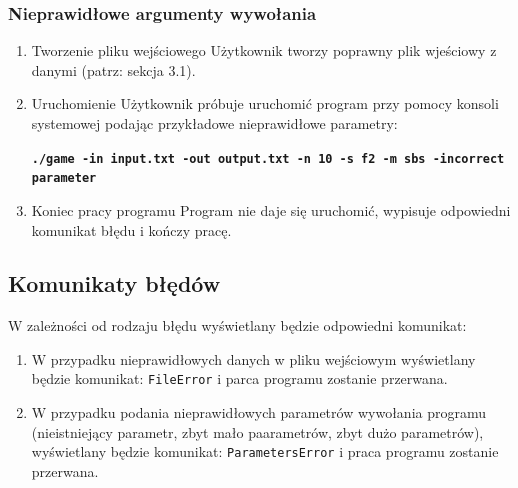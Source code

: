 \documentclass[a4paper]{article}
\begin{document}
\subsubsection{Nieprawid\l{}owe argumenty wywo\l{}ania}
\begin{enumerate}
	\item Tworzenie pliku wej\'sciowego
                U\.zytkownik tworzy poprawny plik wje\'sciowy z danymi (patrz: sekcja 3.1).
	\item Uruchomienie
		U\.zytkownik pr\'obuje uruchomi\'c program przy pomocy konsoli systemowej podaj\k{a}c przyk\l{}adowe nieprawid\l{}owe parametry:
	\begin{center}
                \texttt{\textbf{./game -in input.txt -out output.txt -n 10 -s f2 -m sbs -incorrect parameter}}
        \end{center}
	\item Koniec pracy programu
                Program nie daje si\k{e} uruchomi\'c, wypisuje odpowiedni komunikat b\l{}\k{e}du i ko\'nczy prac\k{e}.
\end{enumerate}

\subsection{Komunikaty b\l{}\k{e}d\'ow}
\quad W zale\.zno\'sci od rodzaju b\l{}\k{e}du wy\'swietlany b\k{e}dzie odpowiedni komunikat:
\begin{enumerate}
	\item W przypadku nieprawid\l{}owych danych w pliku wej\'sciowym wy\'swietlany b\k{e}dzie komunikat: \texttt{FileError} i parca programu zostanie przerwana.
	\item W przypadku podania nieprawid\l{}owych parametr\'ow wywo\l{}ania programu (nieistniej\k{a}cy parametr, zbyt ma\l{}o paarametr\'ow, zbyt du\.zo parametr\'ow), wy\'swietlany b\k{e}dzie komunikat: \texttt{ParametersError} i praca programu zostanie przerwana.
\end{enumerate}
\end{document}
